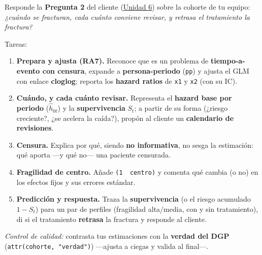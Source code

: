 \documentclass[
  letterpaper,
  DIV=11,
  numbers=noendperiod]{scrartcl}
\providecommand{\tightlist}{%
  \setlength{\itemsep}{0pt}\setlength{\parskip}{0pt}}\usepackage{longtable,booktabs,array}
\begin{document}
\begin{tcolorbox}[enhanced jigsaw, coltitle=black, rightrule=.15mm, arc=.35mm, leftrule=.75mm, colback=white, colbacktitle=quarto-callout-important-color!10!white, left=2mm, breakable, toptitle=1mm, toprule=.15mm, bottomtitle=1mm, titlerule=0mm, title=\textcolor{quarto-callout-important-color}{\faExclamation}\hspace{0.5em}{Tarea del estudiante (1.5) --- resuelve la Pregunta 2 del caso}, bottomrule=.15mm, opacityback=0, opacitybacktitle=0.6, colframe=quarto-callout-important-color-frame]

Responde la \textbf{Pregunta 2} del cliente
(\protect\hyperlink{sec-u16}{Unidad 6}) sobre la cohorte de tu equipo:
\emph{¿cuándo se fracturan, cada cuánto conviene revisar, y retrasa el
tratamiento la fractura?}

Tareas:

\begin{enumerate}
\def\labelenumi{\arabic{enumi}.}
\tightlist
\item
  \textbf{Prepara y ajusta (RA7).} Reconoce que es un problema de
  \textbf{tiempo-a-evento con censura}, expande a
  \textbf{persona-periodo} (\texttt{pp}) y ajusta el GLM con enlace
  \textbf{cloglog}; reporta los \textbf{hazard ratios} de \texttt{x1} y
  \texttt{x2} (con su IC).
\item
  \textbf{Cuándo, y cada cuánto revisar.} Representa el \textbf{hazard
  base por periodo} (\(\hat h_{0t}\)) y la \textbf{supervivencia}
  \(S_t\); a partir de su forma (¿riesgo creciente?, ¿se acelera la
  caída?), propón al cliente un \textbf{calendario de revisiones}.
\item
  \textbf{Censura.} Explica por qué, siendo \textbf{no informativa}, no
  sesga la estimación: qué aporta ---y qué no--- una paciente censurada.
\item
  \textbf{Fragilidad de centro.} Añade \texttt{(1\ \textbar{}\ centro)}
  y comenta qué cambia (o no) en los efectos fijos y sus errores
  estándar.
\item
  \textbf{Predicción y respuesta.} Traza la \textbf{supervivencia} (o el
  riesgo acumulado \(1-S_t\)) para un par de perfiles (fragilidad
  alta/media, con y sin tratamiento), di si el tratamiento
  \textbf{retrasa} la fractura y responde al cliente.
\end{enumerate}

\emph{Control de calidad:} contrasta tus estimaciones con la
\textbf{verdad del DGP} (\texttt{attr(cohorte,\ "verdad")}) ---ajusta a
ciegas y valida al final---.

\end{tcolorbox}
\end{document}
